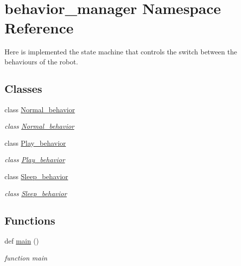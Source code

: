 \hypertarget{namespacebehavior__manager}{}\section{behavior\+\_\+manager Namespace Reference}
\label{namespacebehavior__manager}


Here is implemented the state machine that controls the switch between the behaviours of the robot.  


\subsection*{Classes}
\begin{DoxyCompactItemize}
\item 
class \hyperlink{classbehavior__manager_1_1Normal__behavior}{Normal\+\_\+behavior}
\begin{DoxyCompactList}\small\item\em class \hyperlink{classbehavior__manager_1_1Normal__behavior}{Normal\+\_\+behavior} \end{DoxyCompactList}\item 
class \hyperlink{classbehavior__manager_1_1Play__behavior}{Play\+\_\+behavior}
\begin{DoxyCompactList}\small\item\em class \hyperlink{classbehavior__manager_1_1Play__behavior}{Play\+\_\+behavior} \end{DoxyCompactList}\item 
class \hyperlink{classbehavior__manager_1_1Sleep__behavior}{Sleep\+\_\+behavior}
\begin{DoxyCompactList}\small\item\em class \hyperlink{classbehavior__manager_1_1Sleep__behavior}{Sleep\+\_\+behavior} \end{DoxyCompactList}\end{DoxyCompactItemize}
\subsection*{Functions}
\begin{DoxyCompactItemize}
\item 
def \hyperlink{namespacebehavior__manager_a81416c498199e9a8bc275514afaf9944}{main} ()
\begin{DoxyCompactList}\small\item\em function main \end{DoxyCompactList}\end{DoxyCompactItemize}

